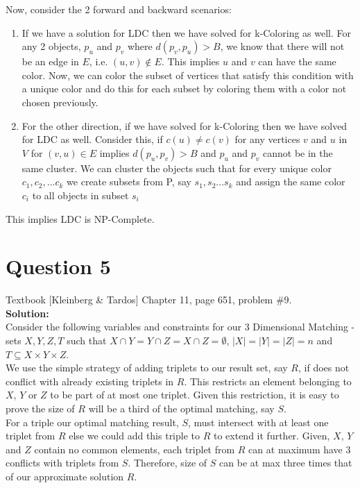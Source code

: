 \documentclass[11pt]{article}
\begin{document}
Now, consider the 2 forward and backward scenarios:

\begin{enumerate}
\item If we have a solution for LDC then we have solved for k-Coloring as well. For any 2 objects, $ p_u $ and $ p_v $ where $ d(p_v, p_u) > B $, we know that there will not be an edge in $ E $, i.e. $ (u,v) \notin E $. This implies $ u $ and $ v $ can have the same color. Now, we can color the subset of vertices that satisfy this condition with a unique color and do this for each subset by coloring them with a color not chosen previously.

\item For the other direction, if we have solved for k-Coloring then we have solved for LDC as well. Consider this, if $ c(u) \ne c(v) $ for any vertices $ v $ and $ u $ in $ V $ for $ (v, u) \in E $ implies $ d(p_u, p_v) > B $ and $ p_u $ and $ p_v $ cannot be in the same cluster. We can cluster the objects such that for every unique color $ c_1, c_2, ... c_k $ we create subsets from P, say $ s_1, s_2 ... s_k $ and assign the same color $ c_i $ to all objects in subset $ s_i $
\end{enumerate}

This implies LDC is NP-Complete.

\section{Question 5} Textbook [Kleinberg \& Tardos] Chapter 11, page 651, problem \#9. \\
\textbf{Solution:} \\

Consider the following variables and constraints for our 3 Dimensional Matching - sets $ X,Y,Z,T $ such that $ X \cap Y = Y \cap Z = X \cap Z = \emptyset $, $|X|=|Y|=|Z|=n$ and $ T \subseteq X \times Y \times Z $. \\

We use the simple strategy of adding triplets to our result set, say $ R $, if does not conflict with already existing triplets in $ R $. This restricts an element belonging to $ X $, $ Y $ or $ Z $ to be part of at most one triplet. Given this restriction, it is easy to prove the size of $ R $ will be a third of the optimal matching, say $ S $. \\

For a triple our optimal matching result, $ S $, must intersect with at least one triplet from $ R $ else we could add this triple to $ R $ to extend it further. Given, $ X $, $ Y $ and $ Z $ contain no common elements, each triplet from $ R $ can at maximum have 3 conflicts with triplets from $ S $. Therefore, size of $ S $ can be at max three times that of our approximate solution $ R $.
\end{document}
